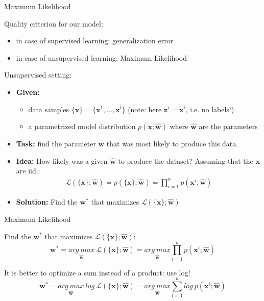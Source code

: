 \documentclass[xcolor=pdftex,dvipsnames,table]{beamer}
\begin{document}
\begin{frame}{Maximum Likelihood}
	\par
	\scriptsize
	\textcolor{NavyBlue}{Quality criterion for our model:}
	\begin{itemize}
		\item in case of supervised learning: generalization error
		\item in case of unsupervised learning: Maximum Likelihood
	\end{itemize}
	
	\textcolor{NavyBlue}{Unsupervised setting:}
	\begin{itemize}
		\item \textbf{Given:}
			\begin{itemize} \scriptsize
				\item data samples $\{\mathbf{x} \} = \{\mathbf{x}^1, \ldots, \mathbf{x}^l\}$   (note: here $\mathbf{z}^i =  \mathbf{x}^i$, i.e. no labels!)
				\item a parametrized model distribution $p(\mathbf{x} ; \hat{\mathbf{w}})$ where $\hat{\mathbf{w}}$ are the parameters
			\end{itemize}  
		\item \textbf{Task:} find the parameter $\mathbf{w}$ that was most likely to produce this data.
		\item \textbf{Idea:} How likely was a given $\hat{\mathbf{w}}$ to produce the dataset? Assuming that the $\mathbf{x}$ are iid.:
	\begin{align*}
		\mathcal{L}(\{\mathbf{x}\}; \hat{\mathbf{w}}) = p(\{\mathbf{x}\};\hat{\mathbf{w}}) =  \prod_{i=1}^n p(\mathbf{x}^i ; \hat{\mathbf{w}})
	\end{align*}
	\item \textbf{Solution:} Find the $\mathbf{w}^*$ that maximizes $\mathcal{L}(\{\mathbf{x}\}; \hat{\mathbf{w}})$ %
	\end{itemize}
\end{frame}


\begin{frame}{Maximum Likelihood}
	\par
	\scriptsize
	\textcolor{NavyBlue}{Find the $\mathbf{w}^*$ that maximizes $\mathcal{L}(\{\mathbf{x}\}; \hat{\mathbf{w}})$:}
	\begin{equation*}
		\mathbf{w}^* = \underset{ \hat{\mathbf{w}}}{arg \ max} \ \mathcal{L}(\{\mathbf{x}\}; \hat{\mathbf{w}}) = \underset{\hat{\mathbf{w}}}{arg \ max}\prod_{i=1}^n p(\mathbf{x}^i ; \hat{\mathbf{w}})
	\end{equation*}
	
	\textcolor{NavyBlue}{It is better to optimize a sum instead of a product: use log!}
	\begin{equation*}
		\mathbf{w}^* = \underset{ \hat{\mathbf{w}}}{arg \ max} \ log \ \mathcal{L}(\{\mathbf{x}\}; \hat{\mathbf{w}}) = \underset{\hat{\mathbf{w}}}{arg \ max}\sum_{i=1}^n log \ p(\mathbf{x}^i ; \hat{\mathbf{w}})
	\end{equation*}
\end{frame}
\end{document}
